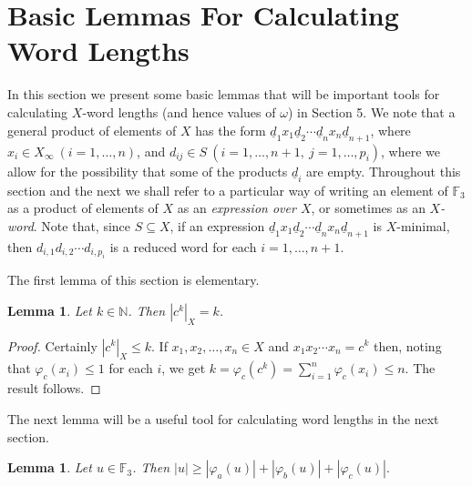 \documentclass[twoside,11pt]{amsart}
\numberwithin{equation}{section}
\newtheorem{lemma}[theorem]{Lemma}
\theoremstyle{definition}
\newcommand {\N}{\mathbb N}
\newcommand{\1}{\mathbbm{1}}
\newcommand{\F}{\mathbb F}
\newcommand{\pdt}{\underline}
\begin{document}
	
	\section{Basic Lemmas For Calculating Word Lengths}
	\noindent
	In this section we present some basic lemmas that will be important tools for calculating $X$-word lengths (and hence values of $\omega$) in Section 5. We note that a general product of elements of $X$ has the form $\pdt{d}_1 x_1 \pdt{d}_2 \cdots \pdt{d}_n x_n \pdt{d}_{n+1}$, where $x_i \in X_\infty \ (i = 1, \ldots, n)$, and ${d_{ij} \in S} \ (i = 1, \ldots, n+1, \ j = 1, \ldots, p_i)$, where we allow for the possibility that some of the products $\pdt{d}_i$ are empty. Throughout this section and the next we shall refer to a particular way of writing an element of $\F_3$ as a product of elements of $X$ as an \textit{expression over $X$}, or sometimes as an \textit{$X$-word}. Note that, since $S \subseteq X$, if an expression $\pdt{d}_1 x_1 \pdt{d}_2 \cdots \pdt{d}_n x_n \pdt{d}_{n+1}$ is $X$-minimal, then $d_{i, 1} d_{i,2} \cdots d_{i,p_i}$ is a reduced word for each $i=1, \ldots, n+1$.
	
	The first lemma of this section is elementary.
	
	\begin{lemma} 	\label{3.1c}
		Let $k \in \N$. Then $|c^k|_X = k$.
	\end{lemma}
	
	\begin{proof}
		Certainly $|c^k|_X \leq k$. If $x_1,x_2, \ldots, x_n \in X$ and $x_1x_2 \cdots x_n = c^k$ then, noting that $\varphi_c(x_i) \leq 1$ for each $i$, we get 
		$k = \varphi_c(c^k) = \sum_{i=1}^n \varphi_c(x_i) \leq n.$
		The result follows.
	\end{proof}
	
	The next lemma will be a useful tool for calculating word lengths in the next section.
	
	\begin{lemma} 	\label{3.0}
		Let $u \in \F_3$. Then $|u| \geq |\varphi_a(u)| + |\varphi_b(u)| + |\varphi_c(u)|.$
	\end{lemma}
	
\end{document}
